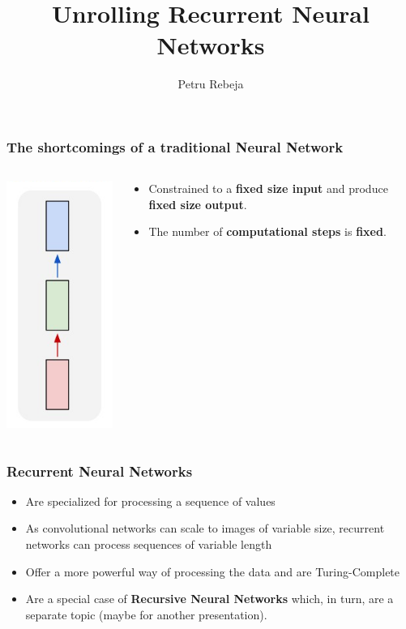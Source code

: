 \documentclass{beamer}
\title{Unrolling Recurrent Neural Networks}
\author{Petru Rebeja}
\begin{document}
\maketitle
\begin{frame}
  \frametitle{The shortcomings of a traditional Neural Network \cite{rnn-efectiveness}}
  \begin{columns}
    \begin{column}{0.3\textwidth}
      \begin{center}
        \includegraphics[height=0.7\textheight]{../img/vanilla-nn.png}
      \end{center}
    \end{column}
    \begin{column}{0.7\textwidth}
      \begin{itemize}
        \item Constrained to a \textbf{fixed size input} and produce \textbf{fixed size output}.
        \item The number of \textbf{computational steps} is \textbf{fixed}.
      \end{itemize}
    \end{column}
  \end{columns}
\end{frame}
\begin{frame}
  \frametitle{Recurrent Neural Networks}
  \begin{itemize}
    \item Are specialized for processing a sequence of values \cite{goodfellow-et-al-2016}
    \item As convolutional networks can scale to images of variable size, recurrent networks can process sequences of variable length \cite{goodfellow-et-al-2016}
    \item Offer a more powerful way of processing the data \cite{rnn-lecture} and are Turing-Complete \cite{siegelmann1995}
    \item Are a special case of \textbf{Recursive Neural Networks} which, in turn, are a separate topic (maybe for another presentation).
  \end{itemize}
\end{frame}
\end{document}
